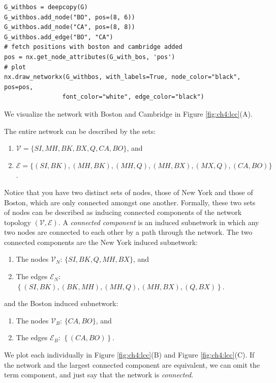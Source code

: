 \begin{lstlisting}[style=python]
G_withbos = deepcopy(G)
G_withbos.add_node("BO", pos=(8, 6))
G_withbos.add_node("CA", pos=(8, 8))
G_withbos.add_edge("BO", "CA")
# fetch positions with boston and cambridge added
pos = nx.get_node_attributes(G_with_bos, 'pos')
# plot
nx.draw_networkx(G_withbos, with_labels=True, node_color="black", pos=pos,
                font_color="white", edge_color="black")
\end{lstlisting}

We visualize the network with Boston and Cambridge in Figure \ref{fig:ch4:lcc}(A). 

The entire network can be described by the sets:
\begin{enumerate}
    \item $\mathcal V = \{SI, MH, BK, BX, Q, CA, BO\}$, and
    \item $\mathcal E = \{(SI, BK), (MH, BK), (MH, Q), (MH, BX), (MX, Q), (CA, BO)\}$.
\end{enumerate}

Notice that you have two distinct sets of nodes, those of New York and those of Boston, which are {only} connected amongst one another. Formally, these two sets of nodes can be described as inducing {connected components} of the network topology $(\mathcal V, \mathcal E)$. A \textit{connected component} is an induced subnetwork in which any two nodes are connected to each other by a path through the network. The two connected components are the New York induced subnetwork:

\begin{enumerate}
    \item The nodes $\mathcal V_N$: $\{SI, BK, Q, MH, BX\}$, and
    \item The edges $\mathcal E_N$: $\left\{(SI, BK), (BK, MH), (MH, Q), (MH, BX), (Q, BX)\right\}$.
\end{enumerate}

and the Boston induced subnetwork:
\begin{enumerate}
    \item The nodes $\mathcal V_B$: $\{CA, BO\}$, and
    \item The edges $\mathcal E_B$: $\left\{(CA, BO)\right\}$.
\end{enumerate}

We plot each individually in Figure \ref{fig:ch4:lcc}(B) and Figure \ref{fig:ch4:lcc}(C). If the network and the largest connected component are equivalent, we can omit the term {component}, and just say that the network is \textit{connected}.

